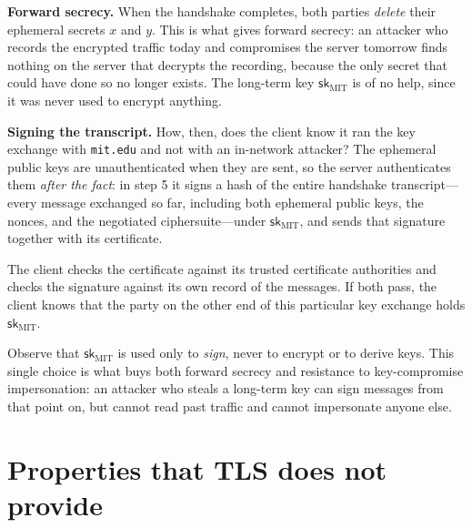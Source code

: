 \documentclass[
  letterpaper,
]{scrbook}
\newcommand{\sk}{\mathsf{sk}}
\theoremstyle{definition}
\theoremstyle{plain}
\theoremstyle{plain}
\theoremstyle{remark}
\begin{document}
\textbf{Forward secrecy.} When the handshake completes, both parties
\emph{delete} their ephemeral secrets \(x\) and \(y\). This is what
gives forward secrecy: an attacker who records the encrypted traffic
today and compromises the server tomorrow finds nothing on the server
that decrypts the recording, because the only secret that could have
done so no longer exists. The long-term key \(\sk_\text{MIT}\) is of no
help, since it was never used to encrypt anything.

\textbf{Signing the transcript.} How, then, does the client know it ran
the key exchange with \texttt{mit.edu} and not with an in-network
attacker? The ephemeral public keys are unauthenticated when they are
sent, so the server authenticates them \emph{after the fact}: in step 5
it signs a hash of the entire handshake transcript---every message
exchanged so far, including both ephemeral public keys, the nonces, and
the negotiated ciphersuite---under \(\sk_\text{MIT}\), and sends that
signature together with its certificate.


The client checks the certificate against its trusted certificate
authorities and checks the signature against its own record of the
messages. If both pass, the client knows that the party on the other end
of this particular key exchange holds \(\sk_\text{MIT}\).

Observe that \(\sk_\text{MIT}\) is used only to \emph{sign}, never to
encrypt or to derive keys. This single choice is what buys both forward
secrecy and resistance to key-compromise impersonation: an attacker who
steals a long-term key can sign messages from that point on, but cannot
read past traffic and cannot impersonate anyone else.

\section{Properties that TLS does not
provide}\label{properties-that-tls-does-not-provide}
\end{document}
